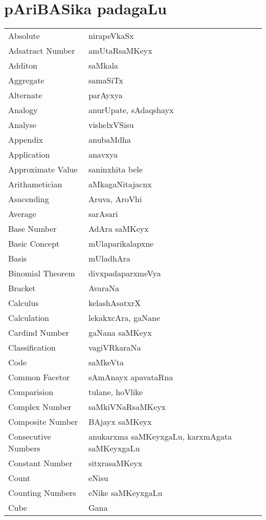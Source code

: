 \chapter{pAriBASika padagaLu}
\vskip -20pt

\begin{longtable}{>{\rm}l@{\hspace{2cm}}l}
Absolute & nirapeVkaSx\\
Adsatract Number & amUtaRsaMKeyx\\
Additon & saMkala\\
Aggregate & samaSiTx\\
Alternate & parAyxya\\
Analogy & anurUpate, sAdaqshayx\\
Analyse & vishelxVSisu\\
Appendix & anubaMdha\\
Application & anavxya \\
Approximate Value & saninxhita bele\\
Arithametician & aMkagaNitajacnx\\
Asacending & Aruva, AroVhi\\
Average & sarAsari \\
Base Number & AdAra saMKeyx\\
Basic Concept & mUlaparikalapxne\\
Basis & mUladhAra \\
Binomial Theorem & divxpadaparxmeVya\\
Bracket & AvaraNa\\
Calculus & kelashAsatxrX\\
Calculation & lekakxcAra, gaNane\\
Cardind Number & gaNana saMKeyx\\
Classification & vagiVRkaraNa\\
Code & saMkeVta\\
Common Facetor & sAmAnayx apavataRna\\
Comparision & tulane, hoVlike\\
Complex Number & saMkiVNaRsaMKeyx\\
Composite Number & BAjayx saMKeyx\\
Consecutive Numbers & anukarxma saMKeyxgaLu, karxmAgata saMKeyxgaLu\\
Constant Number & sitxrasaMKeyx\\
Count & eNisu\\
Counting Numbers & eNike saMKeyxgaLu\\
Cube & Gana\\

\end{longtable}
